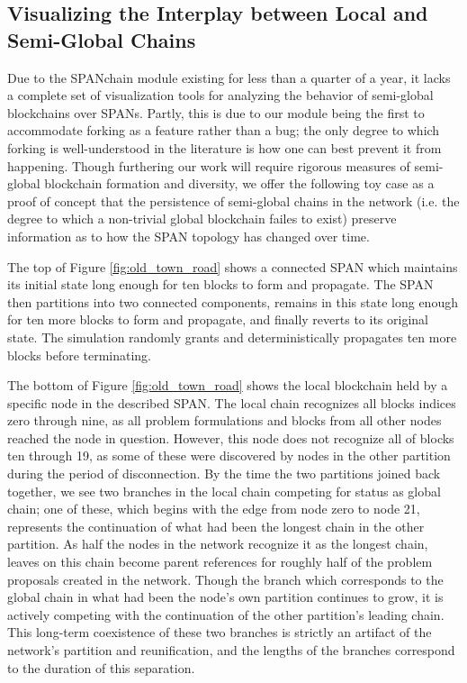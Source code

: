 \subsection{Visualizing the Interplay between Local and Semi-Global Chains}

Due to the SPANchain module existing for less than a quarter of a year, it
lacks a complete set of visualization tools for analyzing the
behavior of semi-global blockchains over SPANs. Partly, this is due to
our module being the first to accommodate forking as a feature rather than
a bug; the only degree to which forking is well-understood in the literature
is how one can best prevent it from happening. Though furthering our work
will require rigorous measures of semi-global blockchain formation and
diversity, we offer the following toy case as a proof of concept that the persistence of
semi-global chains in the network (i.e. the degree to which a non-trivial
global blockchain failes to exist) preserve information as to how the SPAN
topology has changed over time.

The top of Figure \ref{fig:old_town_road} shows a connected SPAN which maintains
its initial state long enough for ten blocks to form and propagate. The SPAN
then partitions into two connected components, remains in this state long enough for
ten more blocks to form and propagate, and finally reverts to its original state.
The simulation randomly grants and deterministically propagates ten more blocks before
terminating.

The bottom of Figure \ref{fig:old_town_road} shows the local blockchain held by a
specific node in the described SPAN. The local chain recognizes all blocks indices
zero through nine, as all problem formulations and blocks from all other nodes
reached the node in question. However, this node does not recognize all of blocks ten
through 19, as some of these were discovered by nodes in the other partition during the
period of disconnection. By the time the two partitions joined back together, we see two
branches in the local chain competing for status as global chain; one of these, which
begins with the edge from node zero to node 21, represents the continuation of what had
been the longest chain in the other partition. As half the nodes in the network recognize
it as the longest chain, leaves on this chain become parent references for roughly half
of the problem proposals created in the network. Though the branch which corresponds to
the global chain in what had been the node's own partition continues to grow, it is
actively competing with the continuation of the other partition's leading chain. This
long-term coexistence of these two branches is strictly an artifact of the network's
partition and reunification, and the lengths of the branches correspond to the duration
of this separation.

